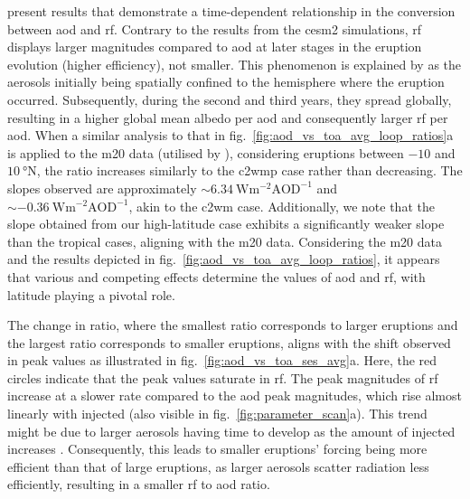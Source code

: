 \documentclass{ametsocV6.1}
\newcommand{\iso}[1][i]{{#1}njected \ce{SO2}}
\begin{document}
\citet[][their Fig.\ 1c,d]{marshall2020} present results that demonstrate a
time-dependent relationship in the conversion between \gls{aod} and \gls{rf}. Contrary
to the results from the \gls{cesm2} simulations, \gls{rf} displays larger magnitudes
compared to \gls{aod} at later stages in the eruption evolution (higher efficiency), not
smaller. This phenomenon is explained by \citet{marshall2020} as the aerosols initially
being spatially confined to the hemisphere where the eruption occurred. Subsequently,
during the second and third years, they spread globally, resulting in a higher global
mean albedo per \gls{aod} and consequently larger \gls{rf} per \gls{aod}. When a similar
analysis to that in fig.~\ref{fig:aod_vs_toa_avg_loop_ratios}a is applied to the
\gls{m20} data (utilised by \citet{marshall2020}), considering eruptions between \(-10\)
and \(\SI{10}{\degree\mathrm{N}}\), the ratio increases similarly to the \gls{c2wmp}
case rather than decreasing. The slopes observed are approximately
\(\sim\SI{6.34}{\watt\metre^{-2}\mathrm{AOD}^{-1}}\) and
\(\sim\SI{-0.36}{\watt\metre^{-2}\mathrm{AOD}^{-1}}\), akin to the \gls{c2wm} case.
Additionally, we note that the slope obtained from our high-latitude case exhibits a
significantly weaker slope than the tropical cases, aligning with the \gls{m20} data.
Considering the \gls{m20} data and the results depicted in
fig.~\ref{fig:aod_vs_toa_avg_loop_ratios}, it appears that various and competing effects
determine the values of \gls{aod} and \gls{rf}, with latitude playing a pivotal role.

The change in ratio, where the smallest ratio corresponds to larger eruptions and the
largest ratio corresponds to smaller eruptions, aligns with the shift observed in peak
values as illustrated in fig.~\ref{fig:aod_vs_toa_ses_avg}a. Here, the red circles
indicate that the peak values saturate in \gls{rf}. The peak magnitudes of \gls{rf}
increase at a slower rate compared to the \gls{aod} peak magnitudes, which rise almost
linearly with \iso{} (also visible in fig.~\ref{fig:parameter_scan}a). This trend might
be due to larger aerosols having time to develop as the amount of \iso{} increases
\citep{niemeier2015,marshall2019}. Consequently, this leads to smaller eruptions'
forcing being more efficient than that of large eruptions, as larger aerosols scatter
radiation less efficiently, resulting in a smaller \gls{rf} to \gls{aod} ratio.
\end{document}
